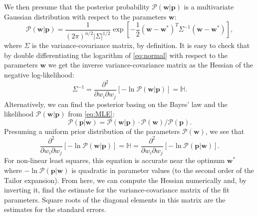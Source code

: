 \documentclass[%
 aip,
 draft,
 amsmath,amssymb,
 reprint,%
]{revtex4-1}
\begin{document}
We then presume that the posterior probability $\mathcal{P}(\mathbf{w}|\mathbf{p})$ is a multivariate Gaussian distribution with respect to the parameters $\mathbf{w}$:
\begin{equation}
\mathcal{P}(\mathbf{w}|\mathbf{p}) = \frac{1}{(2\pi)^{n/2} |\Sigma|^{1/2}} \exp \left[-\frac{1}{2}(\mathbf{w}-\mathbf{w}^*)^T \Sigma^{-1}(\mathbf{w}-\mathbf{w}^*)\right],
\label{eq:normal}
\end{equation}
where $\Sigma$ is the variance-covariance matrix, by definition. It is easy to check that by double differentiating the logarithm of \eqref{eq:normal} with respect to the parameters $\mathbf{w}$ we get the inverse variance-covariance matrix as the Hessian of the negative log-likelihood:
\begin{equation}
\Sigma^{-1} = \frac{\partial^2 }{\partial w_i \partial w_j}[-\ln \mathcal{P}(\mathbf{w}|\mathbf{p})] = \mathbb{H}.
\end{equation}
Alternatively, we can find the posterior basing on the Bayes' law and the likelihood $\mathcal{P}(\mathbf{w}|\mathbf{p})$ from \eqref{eq:MLE}:
\begin{equation}
\mathcal{P}(\mathbf{p}|\mathbf{w}) = \mathcal{P}(\mathbf{w}|\mathbf{p}) \cdot \mathcal{P}(\mathbf{w})/\mathcal{P}(\mathbf{p}).
\end{equation}
Presuming a uniform prior distribution of the parameters $\mathcal{P}(\mathbf{w})$, we see that
\begin{equation}
\frac{\partial^2 }{\partial w_i \partial w_j}[-\ln \mathcal{P}(\mathbf{w}|\mathbf{p})] = \mathbb{H} = \frac{\partial^2 }{\partial w_i \partial w_j}[-\ln \mathcal{P}(\mathbf{p}|\mathbf{w})].
\end{equation}
For non-linear least squares, this equation is accurate near the optimum $\mathbf{w}^*$ where $-\ln \mathcal{P}(\mathbf{p}|\mathbf{w})$ is quadratic in parameter values (to the second order of the Tailor expansion). From here, we can compute the Hessian numerically and, by inverting it, find the estimate for the variance-covariance matrix of the fit parameters. Square roots of the diagonal elements in this matrix are the estimates for the standard errors.

\listoffixmes
\end{document}
